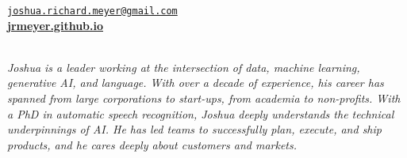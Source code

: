 \documentclass{cv} %
\begin{document}
\vspace{-.25cm}
\begin{center}
\href{mailto:joshua.richard.meyer@gmail.com}{\nolinkurl{joshua.richard.meyer@gmail.com}}\\
\vspace{.15cm}
\href{https://jrmeyer.github.io}{\textbf{jrmeyer.github.io}} \\
\vspace{.15cm}
 \href{https://www.linkedin.com/in/josh-r-meyer/}{\faLinkedin} \hspace{.25cm} \href{https://github.com/JRMeyer}{\faGithub} \hspace{.25cm} \href{https://wa.me/14155899933}{\faWhatsapp} \\

\vspace{.5cm}

\textit{Joshua is a leader working at the intersection of data, machine learning, generative AI, and language. With over a decade of experience, his career has spanned from large corporations to start-ups, from academia to non-profits. With a PhD in automatic speech recognition, Joshua deeply understands the technical underpinnings of AI. He has led teams to successfully plan, execute, and ship products, and he cares deeply about customers and markets.}

\vspace{.5cm}

\end{center}


\vspace{.25cm}
\end{document}
